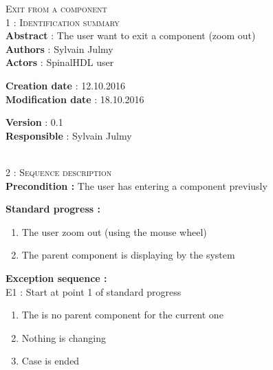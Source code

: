 \begin{flushleft}
    \textsc{\huge Exit from a component}\\[0.5cm]

    \BlackLine
    \textsc{\Large 1 : Identification summary}\\[0.3cm]

        \textbf{\large Abstract} : The user want to exit a component (zoom out)\\[0.1cm]

        \textbf{\large Authors} : Sylvain Julmy \\[0.3cm]			

        \textbf{\large Actors} : SpinalHDL user \\[0.1cm]	
    \begin{minipage}{0.40\textwidth}
        \begin{flushleft}	
            \textbf{\large Creation date} : 12.10.2016 \\[0.1cm]

            \textbf{\large Modification date} : 18.10.2016 \\[0.1cm]
        \end{flushleft}
    \end{minipage}
    \begin{minipage}{0.40\textwidth}
        \begin{flushleft}
            \textbf{\large Version} : 0.1 \\[0.1cm]

            \textbf{\large Responsible} : Sylvain Julmy \\[0.1cm]
        \end{flushleft}
    \end{minipage}
    \\[0.5cm]
    \BlackLine
    \textsc{\Large 2 : Sequence description}\\[0.3cm]

    \textbf{\large Precondition :} The user has entering a component previusly

    \textbf{\large  Standard progress :}
    \begin{enumerate}[nosep]
        \item The user zoom out (using the mouse wheel)
        \item The parent component is displaying by the system
    \end{enumerate}

    \textbf{\large  Exception sequence :}\\
    E1 : Start at point 1 of standard progress
    \begin{enumerate}[nosep]
        \item The is no parent component for the current one
        \item Nothing is changing
        \item Case is ended
    \end{enumerate}
    

\end{flushleft}
